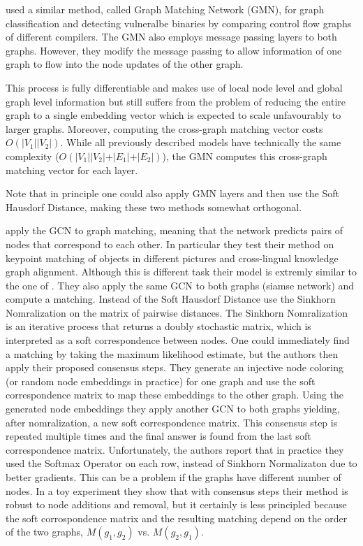 \cite{li2019} used a similar method, called Graph Matching Network (GMN), for graph classification and detecting vulneralbe binaries by comparing control flow graphs of different compilers. The GMN also employs message passing layers to both graphs. However, they modify the message passing to allow information of one graph to flow into the node updates of the other graph.


This process is fully differentiable and makes use of local node level and global graph level information but still suffers from the problem of reducing the entire graph to a single embedding vector which is expected to scale unfavourably to larger graphs. Moreover, computing the cross-graph matching vector costs $O(\vert V_1 \vert \vert V_2 \vert)$. While all previously described models have technically the same complexity ($O(\vert V_1 \vert \vert V_2 \vert + \vert E_1 \vert + \vert E_2 \vert)$), the GMN computes this cross-graph matching vector for each layer.

Note that in principle one could also apply GMN layers and then use the Soft Hausdorf Distance, making these two methods somewhat orthogonal.

\cite{fey2020_update} apply the GCN to graph matching, meaning that the network predicts pairs of nodes that correspond to each other. In particular they test their method on keypoint matching of objects in different pictures and cross-lingual knowledge graph alignment. Although this is different task their model is extremly similar to the one of \cite{riba2018}. They also apply the same GCN to both graphs (siamse network) and compute a matching. Instead of the Soft Hausdorf Distance \cite{fey2020_update} use the Sinkhorn Nomralization \cite{sinkhorn2013} on the matrix of pairwise distances. The Sinkhorn Nomralization is an iterative process that returns a doubly stochastic matrix, which is interpreted as a soft correspondence between nodes. One could immediately find a matching by taking the maximum likelihood estimate, but the authors then apply their proposed consensus steps. They generate an injective node coloring (or random node embeddings in practice) for one graph and use the soft correspondence matrix to map these embeddings to the other graph. Using the generated node embeddings they apply another GCN to both graphs yielding, after nomralization, a new soft correspondence matrix. This consensus step is repeated multiple times and the final answer is found from the last soft correspondence matrix. Unfortunately, the authors report that in practice they used the Softmax Operator on each row, instead of Sinkhorn Normalizaton due to better gradients. This can be a problem if the graphs have different number of nodes. In a toy experiment they show that with consensus steps their method is robust to node additions and removal, but it certainly is less principled because the soft corrospondence matrix and the resulting matching depend on the order of the two graphs, $M(g_1, g_2)$ vs. $M(g_2, g_1)$.





